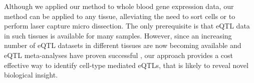   Although we applied our method to whole blood gene expression data, our method can be applied to any 
  tissue, alleviating the need to sort cells or to perform laser capture micro dissection. The only 
  prerequisite is that eQTL data in such tissues is available for many samples. However, since an 
  increasing number of eQTL datasets in different tissues are now becoming available and eQTL meta-analyses 
  have proven successful \cite{Lude:2011, Westra:2013}, our approach provides a cost effective way to identify cell-type 
  mediated eQTLs, that is likely to reveal novel biological insight.

